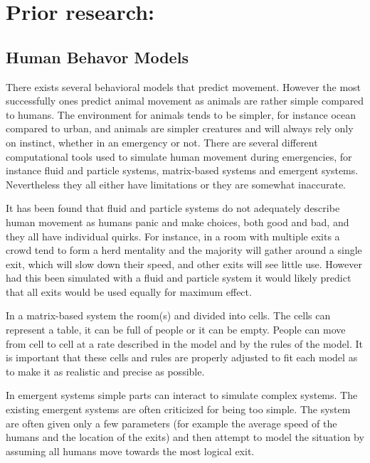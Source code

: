 \chapter{Prior research:}
\label{ch:prior}

\section{Human Behavor Models}
There exists several behavioral models that predict movement. However the most successfully ones predict 
animal movement as animals are rather simple compared to humans. The environment for animals tends to 
be simpler, for instance ocean compared to urban, and animals are simpler creatures and will always rely only 
on instinct, whether in an emergency or not. There are several different computational tools used to simulate  
human movement during emergencies, for instance fluid and particle systems, matrix-based systems and  
emergent systems. Nevertheless they all either have limitations or they are somewhat inaccurate. 
 
It has been found that fluid and particle systems do not adequately describe human movement as humans  
panic and make choices, both good and bad, and they all have individual quirks. For instance, in a room with  
multiple exits a crowd tend to form a herd mentality and the majority will gather around a single exit, which  
will slow down their speed, and other exits will see little use. However had this been simulated with a fluid  
and particle system it would likely predict that all exits would be used equally for maximum effect. 
 
In a matrix-based system the room(s) and divided into cells. The cells can represent a table, it can be full of  
people or it can be empty. People can move from cell to cell at a rate described in the model and by the  
rules of the model. It is important that these cells and rules are properly adjusted to fit each model as to  
make it as realistic and precise as possible. 
 
In emergent systems simple parts can interact to simulate complex systems. The existing emergent systems  
are often criticized for being too simple. The system are often given only a few parameters (for example the  
average speed of the humans and the location of the exits) and then attempt to model the situation by  
assuming all humans move towards the most logical exit. 
 
